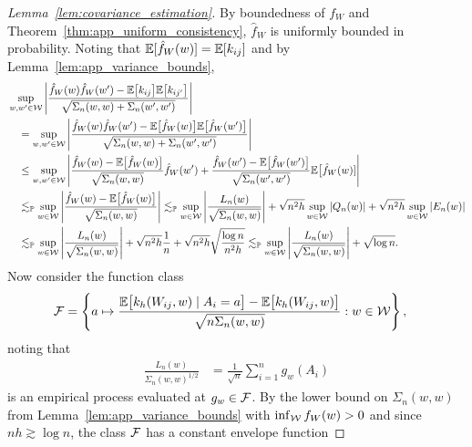 \begin{proof}[Lemma~\ref{lem:covariance_estimation}]
  By boundedness of $f_W$ and
  Theorem~\ref{thm:app_uniform_consistency},
  $\hat f_W$ is uniformly bounded in probability.
  Noting that
  $\mathbb{E}[\hat f_W(w)] = \mathbb{E}[k_{ij}]$
  and by Lemma~\ref{lem:app_variance_bounds},
  \begin{align*}
    &\sup_{w,w' \in \mathcal{W}}
    \left|
    \frac{
      \hat f_W(w) \hat f_W(w')
      - \mathbb{E}\big[k_{ij}\big] \mathbb{E}\big[k_{ij'}\big]}
    {\sqrt{\Sigma_n(w,w) + \Sigma_n(w',w')}}
    \right| \\
    &\quad=
    \sup_{w,w' \in \mathcal{W}}
    \left|
    \frac{
      \hat f_W(w) \hat f_W(w')
      - \mathbb{E}\big[\hat f_W(w)\big] \mathbb{E}\big[\hat f_W(w')\big]}
    {\sqrt{\Sigma_n(w,w) + \Sigma_n(w',w')}}
    \right| \\
    &\quad\leq
    \sup_{w,w' \in \mathcal{W}}
    \left|
    \frac{\hat f_W(w) - \mathbb{E}\big[\hat f_W(w)\big]}
    {\sqrt{\Sigma_n(w,w)}}
    \hat f_W(w')
    + \frac{\hat f_W(w') - \mathbb{E}\big[\hat f_W(w')\big]}
    {\sqrt{\Sigma_n(w',w')}}
    \mathbb{E}\big[\hat f_W(w)]
    \right| \\
    &\quad\lesssim_{\mathbb{P}}
    \sup_{w \in \mathcal{W}}
    \left|
    \frac{\hat f_W(w) - \mathbb{E}\big[\hat f_W(w)\big]}
    {\sqrt{\Sigma_n(w,w)}}
    \right|
    \lesssim_{\mathbb{P}}
    \sup_{w \in \mathcal{W}}
    \left|
    \frac{L_n(w)}
    {\sqrt{\Sigma_n(w,w)}}
    \right|
    + \sqrt{n^2h} \sup_{w \in \mathcal{W}} \left| Q_n(w) \right|
    + \sqrt{n^2h} \sup_{w \in \mathcal{W}} \left| E_n(w) \right| \\
    &\quad\lesssim_{\mathbb{P}}
    \sup_{w \in \mathcal{W}}
    \left|
    \frac{L_n(w)}
    {\sqrt{\Sigma_n(w,w)}}
    \right|
    + \sqrt{n^2h} \frac{1}{n}
    + \sqrt{n^2h} \sqrt{\frac{\log n}{n^2h}}
    \lesssim_{\mathbb{P}}
    \sup_{w \in \mathcal{W}}
    \left|
    \frac{L_n(w)}
    {\sqrt{\Sigma_n(w,w)}}
    \right|
    + \sqrt{\log n}.
  \end{align*}
  Now consider the function class
  \begin{align*}
    \mathcal{F}
    &=
    \left\{
    a \mapsto
    \frac{
      \mathbb{E}\big[k_h(W_{ij},w) \mid A_i = a \big]
      - \mathbb{E}\big[k_h(W_{ij},w) \big]}
    {\sqrt{n \Sigma_n(w,w)}}:
    w \in \mathcal{W}
    \right\},
  \end{align*}
  noting that
  \begin{align*}
    \frac{L_n(w)}
    {\Sigma_n(w,w)^{1/2}}
    &=
    \frac{1}{\sqrt n}
    \sum_{i=1}^n
    g_w(A_i)
  \end{align*}
  is an empirical process evaluated at
  $g_w \in \mathcal{F}$.
  By the lower bound on $\Sigma_n(w,w)$
  from Lemma~\ref{lem:app_variance_bounds}
  with $\inf_{\mathcal{W}} f_W(w) > 0$ and since $nh \gtrsim \log n$,
  the class $\mathcal{F}$ has a constant envelope function

\end{proof}
